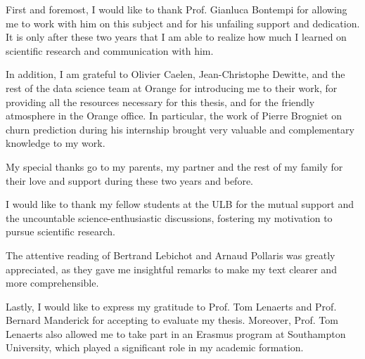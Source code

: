 First and foremost, I would like to thank Prof. Gianluca Bontempi for allowing
me to work with him on this subject and for his unfailing support and
dedication. It is only after these two years that I am able to realize how much
I learned on scientific research and communication with him.

In addition, I am grateful to Olivier Caelen, Jean-Christophe Dewitte, and the
rest of the data science team at Orange for introducing me to their work, for
providing all the resources necessary for this thesis, and for the friendly
atmosphere in the Orange office. In particular, the work of Pierre Brogniet on
churn prediction during his internship brought very valuable and complementary
knowledge to my work.

My special thanks go to my parents, my partner and the rest of my family for
their love and support during these two years and before.

I would like to thank my fellow students at the ULB for the mutual support and
the uncountable science-enthusiastic discussions, fostering my motivation to
pursue scientific research.

The attentive reading of Bertrand Lebichot and Arnaud Pollaris was greatly
appreciated, as they gave me insightful remarks to make my text clearer and more
comprehensible.

Lastly, I would like to express my gratitude to Prof. Tom Lenaerts and Prof.
Bernard Manderick for accepting to evaluate my thesis. Moreover, Prof. Tom
Lenaerts also allowed me to take part in an Erasmus program at Southampton
University, which played a significant role in my academic formation.

\tableofcontents*
\restoregeometry
